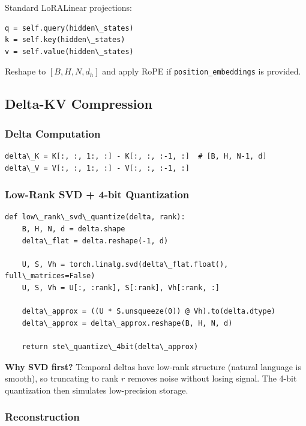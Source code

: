 Standard LoRALinear projections:

\begin{lstlisting}
q = self.query(hidden\_states)
k = self.key(hidden\_states)
v = self.value(hidden\_states)
\end{lstlisting}

Reshape to $[B, H, N, d_h]$ and apply RoPE if \texttt{position\_embeddings} is provided.

\subsection{Delta-KV Compression}

\subsubsection{Delta Computation}

\begin{lstlisting}
delta\_K = K[:, :, 1:, :] - K[:, :, :-1, :]  # [B, H, N-1, d]
delta\_V = V[:, :, 1:, :] - V[:, :, :-1, :]
\end{lstlisting}

\subsubsection{Low-Rank SVD + 4-bit Quantization}

\begin{lstlisting}
def low\_rank\_svd\_quantize(delta, rank):
    B, H, N, d = delta.shape
    delta\_flat = delta.reshape(-1, d)
    
    U, S, Vh = torch.linalg.svd(delta\_flat.float(), full\_matrices=False)
    U, S, Vh = U[:, :rank], S[:rank], Vh[:rank, :]
    
    delta\_approx = ((U * S.unsqueeze(0)) @ Vh).to(delta.dtype)
    delta\_approx = delta\_approx.reshape(B, H, N, d)
    
    return ste\_quantize\_4bit(delta\_approx)
\end{lstlisting}

\textbf{Why SVD first?} Temporal deltas have low-rank structure (natural language is 
smooth), so truncating to rank $r$ removes noise without losing signal. The 
4-bit quantization then simulates low-precision storage.

\subsubsection{Reconstruction}

